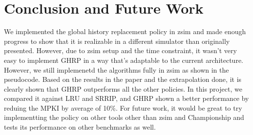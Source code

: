 \documentclass[11pt]{article}
\begin{document}
\section{Conclusion and Future Work}
We implemented the global history replacement policy in zsim and made enough progress to show that it is realizable in a different simulator than originally presented. However, due to zsim setup and the time constraint, it wasn't very easy to implement GHRP in a way that's adaptable to the current architecture. However, we still implemenetd the algorithms fully in zsim as shown in the pseudocode. 
Based on the results in the paper and the extrapolation done, it is clearly shown that GHRP outperforms all the other policies. In this project, we compared it against LRU and SRRIP, and GHRP shown a better performance by reduing the MPKI by average of 10\%.
For future work, it would be great to try implementting the policy on other tools other than zsim and Championship and tests its performance on other benchmarks as well. 

{%
	
	
	}
\end{document}
